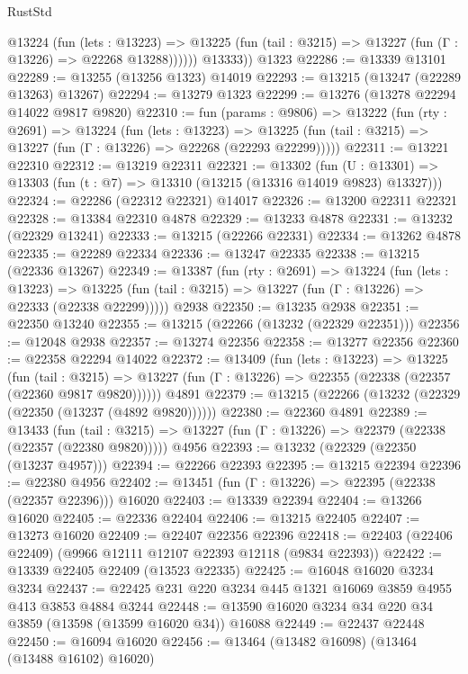 \begin{lexlean}{RustStd}
\begin{coremodule}
            @13224
              (fun (lets : @13223) =>
              @13225 (fun (tail : @3215) => @13227 (fun (Γ : @13226) => @22268 @13288))))))
        @13333))
    @1323
@22286 := @13339 @13101
@22289 := @13255 (@13256 @1323) @14019
@22293 := @13215 (@13247 (@22289 @13263) @13267)
@22294 := @13279 @1323
@22299 := @13276 (@13278 @22294 @14022 @9817 @9820)
@22310 := fun (params : @9806) =>
  @13222
    (fun (rty : @2691) =>
    @13224
      (fun (lets : @13223) =>
      @13225 (fun (tail : @3215) => @13227 (fun (Γ : @13226) => @22268 (@22293 @22299)))))
@22311 := @13221 @22310
@22312 := @13219 @22311
@22321 := @13302
    (fun (U : @13301) => @13303 (fun (t : @7) => @13310 (@13215 (@13316 @14019 @9823) @13327)))
@22324 := @22286 (@22312 @22321) @14017
@22326 := @13200 @22311 @22321
@22328 := @13384 @22310 @4878
@22329 := @13233 @4878
@22331 := @13232 (@22329 @13241)
@22333 := @13215 (@22266 @22331)
@22334 := @13262 @4878
@22335 := @22289 @22334
@22336 := @13247 @22335
@22338 := @13215 (@22336 @13267)
@22349 := @13387
    (fun (rty : @2691) =>
    @13224
      (fun (lets : @13223) =>
      @13225 (fun (tail : @3215) => @13227 (fun (Γ : @13226) => @22333 (@22338 @22299)))))
    @2938
@22350 := @13235 @2938
@22351 := @22350 @13240
@22355 := @13215 (@22266 (@13232 (@22329 @22351)))
@22356 := @12048 @2938
@22357 := @13274 @22356
@22358 := @13277 @22356
@22360 := @22358 @22294 @14022
@22372 := @13409
    (fun (lets : @13223) =>
    @13225
      (fun (tail : @3215) =>
      @13227 (fun (Γ : @13226) => @22355 (@22338 (@22357 (@22360 @9817 @9820))))))
    @4891
@22379 := @13215 (@22266 (@13232 (@22329 (@22350 (@13237 (@4892 @9820))))))
@22380 := @22360 @4891
@22389 := @13433
    (fun (tail : @3215) => @13227 (fun (Γ : @13226) => @22379 (@22338 (@22357 (@22380 @9820)))))
    @4956
@22393 := @13232 (@22329 (@22350 (@13237 @4957)))
@22394 := @22266 @22393
@22395 := @13215 @22394
@22396 := @22380 @4956
@22402 := @13451 (fun (Γ : @13226) => @22395 (@22338 (@22357 @22396))) @16020
@22403 := @13339 @22394
@22404 := @13266 @16020
@22405 := @22336 @22404
@22406 := @13215 @22405
@22407 := @13273 @16020
@22409 := @22407 @22356 @22396
@22418 := @22403 (@22406 @22409) (@9966 @12111 @12107 @22393 @12118 (@9834 @22393))
@22422 := @13339 @22405 @22409 (@13523 @22335)
@22425 := @16048 @16020 @3234 @3234
@22437 := @22425 @231 @220 @3234 @445 @1321 @16069 @3859 @4955 @413 @3853 @4884 @3244
@22448 := @13590 @16020 @3234 @34 @220 @34 @3859 (@13598 (@13599 @16020 @34)) @16088
@22449 := @22437 @22448
@22450 := @16094 @16020
@22456 := @13464 (@13482 @16098) (@13464 (@13488 @16102) @16020)

\end{coremodule}
\end{lexlean}
